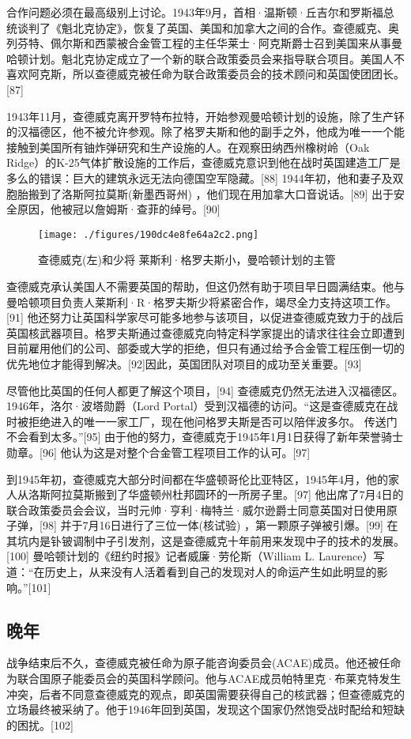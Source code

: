 合作问题必须在最高级别上讨论。1943年9月，首相·温斯顿·丘吉尔和罗斯福总统谈判了《魁北克协定》，恢复了英国、美国和加拿大之间的合作。查德威克、奥列芬特、佩尔斯和西蒙被合金管工程的主任华莱士·阿克斯爵士召到美国来从事曼哈顿计划。魁北克协定成立了一个新的联合政策委员会来指导联合项目。美国人不喜欢阿克斯，所以查德威克被任命为联合政策委员会的技术顾问和英国使团团长。[87]

1943年11月，查德威克离开罗特布拉特，开始参观曼哈顿计划的设施，除了生产钚的汉福德区，他不被允许参观。除了格罗夫斯和他的副手之外，他成为唯一一个能接触到美国所有铀炸弹研究和生产设施的人。在观察田纳西州橡树岭（Oak Ridge）的K-25气体扩散设施的工作后，查德威克意识到他在战时英国建造工厂是多么的错误：巨大的建筑永远无法向德国空军隐藏。[88] 1944年初，他和妻子及双胞胎搬到了洛斯阿拉莫斯(新墨西哥州) ，他们现在用加拿大口音说话。[89] 出于安全原因，他被冠以詹姆斯·查菲的绰号。[90]
\begin{figure}[ht]
\centering
\texttt{[image: ./figures/190dc4e8fe64a2c2.png]}
\caption{查德威克(左)和少将 莱斯利·格罗夫斯小，曼哈顿计划的主管} \label{fig_CHFR_8}
\end{figure}
查德威克承认美国人不需要英国的帮助，但这仍然有助于项目早日圆满结束。他与曼哈顿项目负责人莱斯利·R·格罗夫斯少将紧密合作，竭尽全力支持这项工作。[91] 他还努力让英国科学家尽可能多地参与该项目，以促进查德威克致力于的战后英国核武器项目。格罗夫斯通过查德威克向特定科学家提出的请求往往会立即遭到目前雇用他们的公司、部委或大学的拒绝，但只有通过给予合金管工程压倒一切的优先地位才能得到解决。[92]因此，英国团队对项目的成功至关重要。[93]

尽管他比英国的任何人都更了解这个项目，[94] 查德威克仍然无法进入汉福德区。1946年，洛尔·波塔勋爵（Lord Portal）受到汉福德的访问。“这是查德威克在战时被拒绝进入的唯一一家工厂，现在他问格罗夫斯是否可以陪伴波多尔。 传送门不会看到太多。”[95] 由于他的努力，查德威克于1945年1月1日获得了新年荣誉骑士勋章。[96] 他认为这是对整个合金管工程项目工作的认可。[97]

到1945年初，查德威克大部分时间都在华盛顿哥伦比亚特区，1945年4月，他的家人从洛斯阿拉莫斯搬到了华盛顿州杜邦圆环的一所房子里。[97] 他出席了7月4日的联合政策委员会会议，当时元帅·亨利·梅特兰·威尔逊爵士同意英国对日使用原子弹，[98] 并于7月16日进行了三位一体(核试验) ，第一颗原子弹被引爆。[99] 在其坑内是钋铍调制中子引发剂，这是查德威克十年前用来发现中子的技术的发展。[100] 曼哈顿计划的《纽约时报》记者威廉·劳伦斯（William L. Laurence）写道：“在历史上，从来没有人活着看到自己的发现对人的命运产生如此明显的影响。”[101]

\subsection{晚年}
战争结束后不久，查德威克被任命为原子能咨询委员会(ACAE)成员。他还被任命为联合国原子能委员会的英国科学顾问。他与ACAE成员帕特里克·布莱克特发生冲突，后者不同意查德威克的观点，即英国需要获得自己的核武器；但查德威克的立场最终被采纳了。他于1946年回到英国，发现这个国家仍然饱受战时配给和短缺的困扰。[102]


